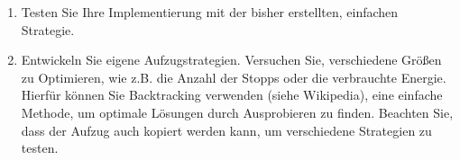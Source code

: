\documentclass[
  accentcolor=tud1c,	%
  colorbacktitle,		%
  inverttitle,			%
  german,				%
  twoside
]{tudexercise}
\begin{document}
\begin{enumerate}
\item Testen Sie Ihre Implementierung mit der bisher erstellten, einfachen Strategie.

\item Entwickeln Sie eigene Aufzugstrategien. Versuchen Sie, verschiedene Größen zu Optimieren, wie z.B. die Anzahl der Stopps oder die verbrauchte Energie. Hierfür können Sie Backtracking verwenden (siehe Wikipedia), eine einfache Methode, um optimale Lösungen durch Ausprobieren zu finden. Beachten Sie, dass der Aufzug auch kopiert werden kann, um verschiedene Strategien zu testen.

\end{enumerate}
\end{document}
